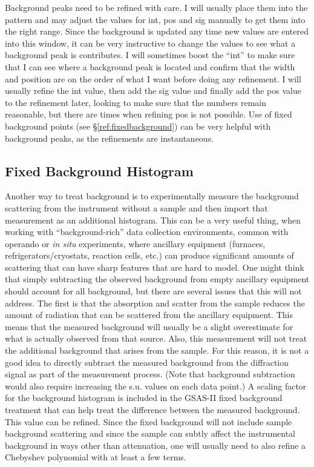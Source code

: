 Background peaks need to be refined with care. I will usually place them into the pattern and may adjust the values for int, pos and sig manually to get them into the right range. Since the background is updated any time new values are entered into this window, it can be very instructive to change the values to see what a background peak is contributes. I will sometimes boost the ``int'' to make sure that I can see where a background peak is located and confirm that the width and position are on the order of what I want before doing any refinement. I will usually refine the int value, then add the sig value and finally add the pos value to the refinement later, looking to make sure that the numbers remain reasonable, but there are times when refining pos is not possible. 
Use of fixed background points (see \S\ref{ref:fixedbackground}) can be very helpful with background peaks, as the refinements are instantaneous.  

\subsection{Fixed Background Histogram}

Another way to treat background is to experimentally measure the background scattering from the instrument without a sample and then import that measurement as an additional histogram. 
This can be a very useful thing, when working with ``background-rich'' data collection environments, common with operando or \textit{in situ} experiments, where ancillary equipment (furnaces, refrigerators/cryostats, reaction cells, etc.) can produce significant amounts of scattering that can have sharp features that are hard to model.
One might think that simply subtracting the observed background from empty ancillary equipment should account for all background, but there are several issues that this will not address. 
The first is that the absorption and scatter from the sample reduces the amount of radiation that can be scattered from the ancillary equipment. This means that the measured background will usually be a slight overestimate for what is actually observed from that source. 
Also, this measurement will not treat the additional background that arises from the sample. For this reason, it is not a good idea to directly subtract the measured background from the diffraction signal as part of the measurement process. 
(Note that background subtraction would also require increasing the s.u. values on each data point.)  
A scaling factor for the background histogram is included in the GSAS-II fixed background treatment that can help treat the difference between the measured background. This value can be refined. Since the fixed background will not include sample background scattering and since the sample can subtly affect the instrumental background in ways other than attenuation, one will usually need to also refine a Chebyshev polynomial with at least a few terms. 


